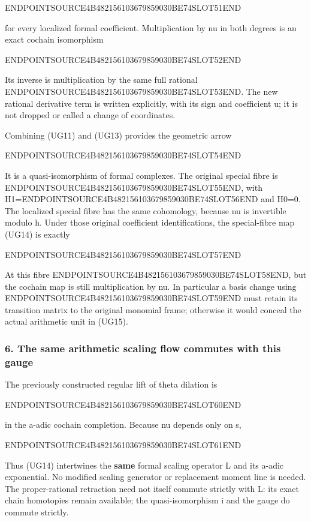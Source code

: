 ENDPOINTSOURCE4B482156103679859030BE74SLOT51END

for every localized formal coefficient. Multiplication by nu in both degrees is an exact cochain isomorphism

ENDPOINTSOURCE4B482156103679859030BE74SLOT52END

Its inverse is multiplication by the same full rational ENDPOINTSOURCE4B482156103679859030BE74SLOT53END. The new rational derivative term is written explicitly, with its sign and coefficient u; it is not dropped or called a change of coordinates.

Combining (UG11) and (UG13) provides the geometric arrow

ENDPOINTSOURCE4B482156103679859030BE74SLOT54END

It is a quasi-isomorphism of formal complexes. The original special fibre is ENDPOINTSOURCE4B482156103679859030BE74SLOT55END, with H1=ENDPOINTSOURCE4B482156103679859030BE74SLOT56END and H0=0. The localized special fibre has the same cohomology, because nu is invertible modulo h. Under those original coefficient identifications, the special-fibre map (UG14) is exactly

ENDPOINTSOURCE4B482156103679859030BE74SLOT57END

At this fibre ENDPOINTSOURCE4B482156103679859030BE74SLOT58END, but the cochain map is still multiplication by nu. In particular a basis change using ENDPOINTSOURCE4B482156103679859030BE74SLOT59END must retain its transition matrix to the original monomial frame; otherwise it would conceal the actual arithmetic unit in (UG15).

\subsubsection{6. The same arithmetic scaling flow commutes with this gauge}\label{endpoint-f1_unit_gauge--the-same-arithmetic-scaling-flow-commutes-with-this-gauge}

The previously constructed regular lift of theta dilation is

ENDPOINTSOURCE4B482156103679859030BE74SLOT60END

in the a-adic cochain completion. Because nu depends only on s,

ENDPOINTSOURCE4B482156103679859030BE74SLOT61END

Thus (UG14) intertwines the \textbf{same} formal scaling operator L and its a-adic exponential. No modified scaling generator or replacement moment line is needed. The proper-rational retraction need not itself commute strictly with L: its exact chain homotopies remain available; the quasi-isomorphism i and the gauge do commute strictly.

